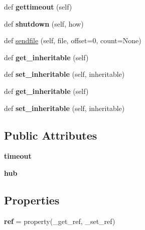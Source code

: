 \begin{DoxyCompactItemize}
\item 
\mbox{\label{classgevent_1_1__socket3_1_1socket_abd0659f1dd56278c3bfb7185ebe2dec2}} 
def {\bfseries gettimeout} (self)
\item 
\mbox{\label{classgevent_1_1__socket3_1_1socket_a87c91ef38d173e2b756db31837f08917}} 
def {\bfseries shutdown} (self, how)
\item 
def \hyperlink{classgevent_1_1__socket3_1_1socket_a0550453e5a9597c2e6b6fbf1d42eae4d}{sendfile} (self, file, offset=0, count=None)
\item 
\mbox{\label{classgevent_1_1__socket3_1_1socket_a248b554663dd9fb2443c5bc01d7f5644}} 
def {\bfseries get\+\_\+inheritable} (self)
\item 
\mbox{\label{classgevent_1_1__socket3_1_1socket_ab5cb67244c8bfc9c996c7f3bb88dbdd5}} 
def {\bfseries set\+\_\+inheritable} (self, inheritable)
\item 
\mbox{\label{classgevent_1_1__socket3_1_1socket_a248b554663dd9fb2443c5bc01d7f5644}} 
def {\bfseries get\+\_\+inheritable} (self)
\item 
\mbox{\label{classgevent_1_1__socket3_1_1socket_ab5cb67244c8bfc9c996c7f3bb88dbdd5}} 
def {\bfseries set\+\_\+inheritable} (self, inheritable)
\end{DoxyCompactItemize}
\subsection*{Public Attributes}
\begin{DoxyCompactItemize}
\item 
\mbox{\label{classgevent_1_1__socket3_1_1socket_a463cd759f672e9df50eaa8ab5c6701b3}} 
{\bfseries timeout}
\item 
\mbox{\label{classgevent_1_1__socket3_1_1socket_a5b19d748ceb1924656c321e26ae5681c}} 
{\bfseries hub}
\end{DoxyCompactItemize}
\subsection*{Properties}
\begin{DoxyCompactItemize}
\item 
\mbox{\label{classgevent_1_1__socket3_1_1socket_af689777d22aeded7a326c434484c77e3}} 
{\bfseries ref} = property(\+\_\+get\+\_\+ref, \+\_\+set\+\_\+ref)
\end{DoxyCompactItemize}


